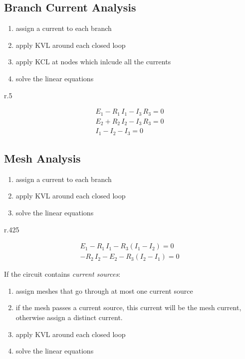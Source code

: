 
\subsection{Branch Current Analysis} %
	\begin{enumerate}
		\item assign a current to each branch
		\item apply KVL around each closed loop
		\item apply KCL at nodes which inlcude all the currents
		\item solve the linear equations
	\end{enumerate}
	
	\begin{wrapfigure}[0]{r}{.5\columnwidth}
		\vspace{-5mm}
	\end{wrapfigure}
	
	\begin{gather*}
		E_1 - R_1 \, I_1 - I_3\, R_3 = 0 \\
		E_2 + R_2 \, I_2 - I_3 \, R_3 = 0 \\
		I_1 - I_2 - I_3 = 0
	\end{gather*}

\subsection{Mesh Analysis} %
	
	\begin{enumerate}
		\item assign a current to each branch
		\item apply KVL around each closed loop
		\item solve the linear equations
	\end{enumerate}

	\begin{wrapfigure}[0]{r}{.425\columnwidth}
		\vspace{-7.5mm}
	\end{wrapfigure}
	\begin{gather*}
		E_1 - R_1 \, I_1 - R_3 (I_1-I_2) = 0 \\
		-R_2 \, I_2 - E_2 - R_3(I_2 - I_1) = 0
	\end{gather*}
	
	If the circuit contains \emph{current sources}:
	\begin{enumerate}
		\item assign meshes that go through at most one current source
		\item if the mesh passes a current source, this current will be the mesh current, otherwise assign a distinct current.
		\item apply KVL around each closed loop
		\item solve the linear equations
	\end{enumerate}
	
